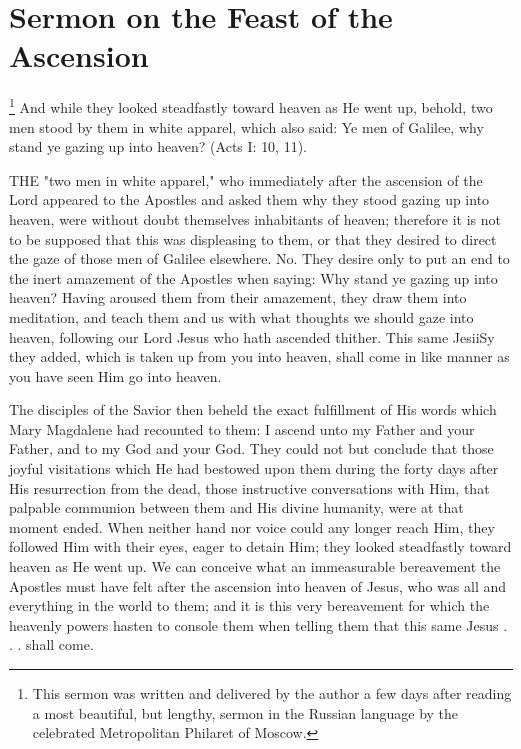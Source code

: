 \chapter{Sermon on the Feast of the Ascension}

\footnote{This sermon was written and delivered by the
author a few days after reading a most beautiful, but
lengthy, sermon in the Russian language by the celebrated
Metropolitan Philaret of Moscow.}
And while they looked steadfastly toward heaven as He 
went up, behold, two men stood by them in white apparel, 
which also said: Ye men of Galilee, why stand ye gazing 
up into heaven? (Acts I: 10, 11). 

THE "two men in white apparel," who immediately
after the ascension of the Lord appeared
to the Apostles and asked them why they 
stood gazing up into heaven, were without doubt 
themselves inhabitants of heaven; therefore it 
is not to be supposed that this was displeasing 
to them, or that they desired to direct the gaze of 
those men of Galilee elsewhere. No. They desire
only to put an end to the inert amazement 
of the Apostles when saying: Why stand ye 
gazing up into heaven? Having aroused them 
from their amazement, they draw them into meditation,
and teach them and us with what thoughts 
we should gaze into heaven, following our Lord 
Jesus who hath ascended thither. This same
JesiiSy they added, which is taken up from you 
into heaven, shall come in like manner as you 
have seen Him go into heaven. 

The disciples of the Savior then beheld the 
exact fulfillment of His words which Mary 
Magdalene had recounted to them: I ascend 
unto my Father and your Father, and to my 
God and your God. They could not but conclude
that those joyful visitations which He had 
bestowed upon them during the forty days after 
His resurrection from the dead, those instructive 
conversations with Him, that palpable communion
between them and His divine humanity, were 
at that moment ended. When neither hand nor 
voice could any longer reach Him, they followed 
Him with their eyes, eager to detain Him; they 
looked steadfastly toward heaven as He went 
up. We can conceive what an immeasurable 
bereavement the Apostles must have felt after 
the ascension into heaven of Jesus, who was all 
and everything in the world to them; and it is 
this very bereavement for which the heavenly 
powers hasten to console them when telling them 
that this same Jesus . . . shall come. 

